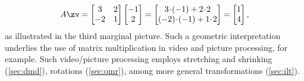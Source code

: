 \begin{equation*}
A\zv=\begin{bmatrix} 3 & 2\\ -2 & 1 \end{bmatrix}
\begin{bmatrix} -1\\2 \end{bmatrix}
=\begin{bmatrix} 3\cdot(-1)+2\cdot2\\ (-2)\cdot(-1)+1\cdot2 \end{bmatrix}
=\begin{bmatrix} 1\\ 4 \end{bmatrix},
\end{equation*}
as illustrated in the third marginal picture.
%
Such a geometric interpretation underlies the use of matrix multiplication in video and picture processing, for example.
Such video\slash picture processing employs stretching and shrinking (\autoref{sec:dmd}), rotations (\autoref{sec:omr}), among more general transformations (\autoref{sec:ilt}).


